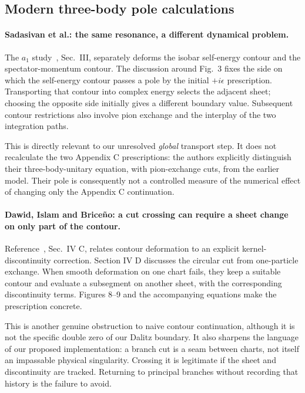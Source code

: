\documentclass[11pt,a4paper]{article}
\begin{document}
\subsection{Modern three-body pole calculations}
\paragraph{Sadasivan et al.: the same resonance, a different dynamical problem.}
The $a_1$ study~\cite{sadasivan}, Sec.~III, separately deforms the isobar self-energy contour and the spectator-momentum contour. The discussion around Fig.~3 fixes the side on which the self-energy contour passes a pole by the initial $+i\epsilon$ prescription. Transporting that contour into complex energy selects the adjacent sheet; choosing the opposite side initially gives a different boundary value. Subsequent contour restrictions also involve pion exchange and the interplay of the two integration paths.

This is directly relevant to our unresolved \emph{global} transport step. It does not recalculate the two Appendix C prescriptions: the authors explicitly distinguish their three-body-unitary equation, with pion-exchange cuts, from the earlier model. Their pole is consequently not a controlled measure of the numerical effect of changing only the Appendix C continuation.

\paragraph{Dawid, Islam and Brice\~no: a cut crossing can require a sheet change on only part of the contour.}
Reference~\cite{dawid}, Sec.~IV C, relates contour deformation to an explicit kernel-discontinuity correction. Section IV D discusses the circular cut from one-particle exchange. When smooth deformation on one chart fails, they keep a suitable contour and evaluate a subsegment on another sheet, with the corresponding discontinuity terms. Figures 8--9 and the accompanying equations make the prescription concrete.

This is another genuine obstruction to naive contour continuation, although it is not the specific double zero of our Dalitz boundary. It also sharpens the language of our proposed implementation: a branch cut is a seam between charts, not itself an impassable physical singularity. Crossing it is legitimate if the sheet and discontinuity are tracked. Returning to principal branches without recording that history is the failure to avoid.
\end{document}
